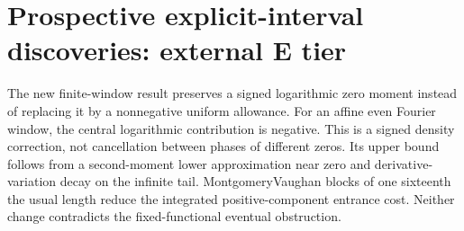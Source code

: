 \documentclass[11pt]{article}
\begin{document}
\begin{center}


\ifdim\wd\eqbox>\linewidth\resizebox{\linewidth}{!}{\usebox{\eqbox}}\else\usebox{\eqbox}\fi

\end{center}

\begin{center}


\ifdim\wd\eqbox>\linewidth\resizebox{\linewidth}{!}{\usebox{\eqbox}}\else\usebox{\eqbox}\fi

\end{center}

\begin{center}


\ifdim\wd\eqbox>\linewidth\resizebox{\linewidth}{!}{\usebox{\eqbox}}\else\usebox{\eqbox}\fi

\end{center}

\section{Prospective explicit-interval discoveries: external E tier}

The new finite-window result preserves a signed logarithmic zero moment instead of replacing it by a nonnegative uniform allowance. For an affine even Fourier window, the central logarithmic contribution is negative. This is a signed density correction, not cancellation between phases of different zeros. Its upper bound follows from a second-moment lower approximation near zero and derivative-variation decay on the infinite tail. MontgomeryVaughan blocks of one sixteenth the usual length reduce the integrated positive-component entrance cost. Neither change contradicts the fixed-functional eventual obstruction.
\end{document}
